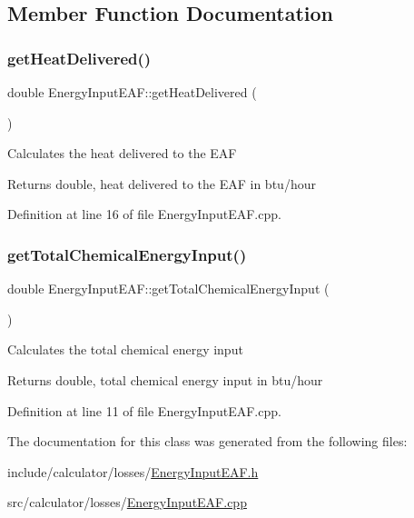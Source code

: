 \subsection{Member Function Documentation}
\mbox{\label{class_energy_input_e_a_f_ad1916eba02c6036a603cf34420169911}} 
\subsubsection{\texorpdfstring{get\+Heat\+Delivered()}{getHeatDelivered()}}
{\footnotesize\ttfamily double Energy\+Input\+E\+A\+F\+::get\+Heat\+Delivered (\begin{DoxyParamCaption}{ }\end{DoxyParamCaption})}

Calculates the heat delivered to the E\+AF \begin{DoxyReturn}{Returns}
double, heat delivered to the E\+AF in btu/hour 
\end{DoxyReturn}


Definition at line 16 of file Energy\+Input\+E\+A\+F.\+cpp.

\mbox{\label{class_energy_input_e_a_f_a44b4a70dcc3e5f0bf9d33eabd6158b2f}} 
\subsubsection{\texorpdfstring{get\+Total\+Chemical\+Energy\+Input()}{getTotalChemicalEnergyInput()}}
{\footnotesize\ttfamily double Energy\+Input\+E\+A\+F\+::get\+Total\+Chemical\+Energy\+Input (\begin{DoxyParamCaption}{ }\end{DoxyParamCaption})}

Calculates the total chemical energy input \begin{DoxyReturn}{Returns}
double, total chemical energy input in btu/hour 
\end{DoxyReturn}


Definition at line 11 of file Energy\+Input\+E\+A\+F.\+cpp.



The documentation for this class was generated from the following files\+:\begin{DoxyCompactItemize}
\item 
include/calculator/losses/\hyperlink{_energy_input_e_a_f_8h}{Energy\+Input\+E\+A\+F.\+h}\item 
src/calculator/losses/\hyperlink{_energy_input_e_a_f_8cpp}{Energy\+Input\+E\+A\+F.\+cpp}\end{DoxyCompactItemize}
